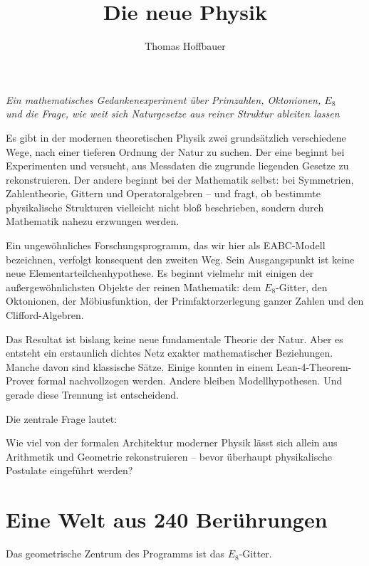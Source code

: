 \documentclass[11pt,a4paper]{article}
\title{Die neue Physik}
\author{Thomas Hoffbauer}
\date{}
\begin{document}
\maketitle

\begin{center}
\large\itshape
Ein mathematisches Gedankenexperiment über Primzahlen, Oktonionen, \(E_8\)\\
und die Frage, wie weit sich Naturgesetze aus reiner Struktur ableiten lassen
\end{center}
\vspace{1.25em}

Es gibt in der modernen theoretischen Physik zwei grundsätzlich verschiedene Wege, nach einer tieferen Ordnung der Natur zu suchen. Der eine beginnt bei Experimenten und versucht, aus Messdaten die zugrunde liegenden Gesetze zu rekonstruieren. Der andere beginnt bei der Mathematik selbst: bei Symmetrien, Zahlentheorie, Gittern und Operatoralgebren – und fragt, ob bestimmte physikalische Strukturen vielleicht nicht bloß beschrieben, sondern durch Mathematik nahezu erzwungen werden.


Ein ungewöhnliches Forschungsprogramm, das wir hier als EABC-Modell bezeichnen, verfolgt konsequent den zweiten Weg. Sein Ausgangspunkt ist keine neue Elementarteilchenhypothese. Es beginnt vielmehr mit einigen der außergewöhnlichsten Objekte der reinen Mathematik: dem \(E_8\)-Gitter, den Oktonionen, der Möbiusfunktion, der Primfaktorzerlegung ganzer Zahlen und den Clifford-Algebren.


Das Resultat ist bislang keine neue fundamentale Theorie der Natur. Aber es entsteht ein erstaunlich dichtes Netz exakter mathematischer Beziehungen. Manche davon sind klassische Sätze. Einige konnten in einem Lean-4-Theorem-Prover formal nachvollzogen werden. Andere bleiben Modellhypothesen. Und gerade diese Trennung ist entscheidend.


Die zentrale Frage lautet:


Wie viel von der formalen Architektur moderner Physik lässt sich allein aus Arithmetik und Geometrie rekonstruieren – bevor überhaupt physikalische Postulate eingeführt werden?





\section{Eine Welt aus 240 Berührungen}


Das geometrische Zentrum des Programms ist das \(E_8\)-Gitter.
\end{document}
